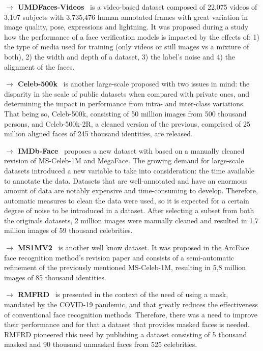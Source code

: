 \documentclass[class=report, crop=false, a4paper, 12pt]{standalone}
\begin{document}
\vspace{0.7\baselineskip}
\noindent\textbf{$\rightarrow$ UMDFaces-Videos}~\autocite{bansalDonTsCNNbased2017} is a video-based dataset composed of 22,075 videos of 3,107 subjects with 3,735,476 human annotated frames with great variation in image quality, pose, expressions and lightning. It was proposed during a study how the performance of a face verification models is impacted by the effects of: 1) the type of media used for training (only videos or still images vs a mixture of both), 2) the width and depth of a dataset, 3) the label's noise and 4) the alignment of the faces.

\vspace{0.7\baselineskip}
\noindent\textbf{$\rightarrow$ Celeb-500k}~\autocite{caoCeleb500KLargeTraining2018} is another large-scale proposed with two issues in mind: the disparity in the scale of public datasets when compared with private ones, and determining the impact in performance from intra- and inter-class variations. That being so, Celeb-500k, consisting of 50 million images from 500 thousand persons, and Celeb-500k-2R, a cleaned version of the previous, comprised of 25 million aligned faces of 245 thousand identities, are released.

\vspace{0.7\baselineskip}
\noindent\textbf{$\rightarrow$ IMDb-Face}~\autocite{wangDevilFaceRecognition2018} proposes a new dataset with based on a manually cleaned revision of MS-Celeb-1M and MegaFace. The growing demand for large-scale datasets introduced a new variable to take into consideration: the time available to annotate the data. Datasets that are well-annotated and have an enormous amount of data are notably expensive and time-consuming to develop. Therefore, automatic measures to clean the data were used, so it is expected for a certain degree of noise to be introduced in a dataset. After selecting a subset from both the originals datasets, 2 million images were manually cleaned and resulted in 1,7 million images of 59 thousand celebrities.

\vspace{0.7\baselineskip}
\noindent\textbf{$\rightarrow$ MS1MV2}~\autocite{dengArcFaceAdditiveAngular} is another well know dataset. It was proposed in the ArcFace face recognition method's revision paper and consists of a semi-automatic refinement of the previously mentioned MS-Celeb-1M, resulting in 5,8 million images of 85 thousand identities.

\vspace{0.7\baselineskip}
\noindent\textbf{$\rightarrow$ RMFRD}~\autocite{wangMaskedFaceRecognition2020} is presented in the context of the need of using a mask, mandated by the COVID-19 pandemic, and that greatly reduces the effectiveness of conventional face recognition methods. Therefore, there was a need to improve their performance and for that a dataset that provides masked faces is needed. RMFRD pioneered this need by publishing a dataset consisting of 5 thousand masked and 90 thousand unmasked faces from 525 celebrities.
\end{document}
